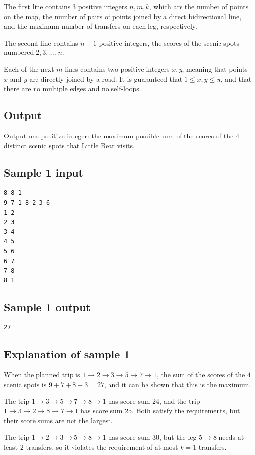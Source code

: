 \documentclass[11pt]{article}
\begin{document}
The first line contains $3$ positive integers $n, m, k$,
which are the number of points on the map,
the number of pairs of points joined by a direct bidirectional line,
and the maximum number of transfers on each leg, respectively.

The second line contains $n-1$ positive integers,
the scores of the scenic spots numbered $2, 3, \ldots, n$.

Each of the next $m$ lines contains two positive integers $x, y$,
meaning that points $x$ and $y$ are directly joined by a road.
It is guaranteed that $1 \le x, y \le n$,
and that there are no multiple edges and no self-loops.

\subsection*{Output}

Output one positive integer:
the maximum possible sum of the scores of the $4$ distinct scenic spots that
Little Bear visits.

\subsection*{Sample 1 input}

\begin{verbatim}
8 8 1
9 7 1 8 2 3 6
1 2
2 3
3 4
4 5
5 6
6 7
7 8
8 1
\end{verbatim}

\subsection*{Sample 1 output}

\begin{verbatim}
27
\end{verbatim}

\subsection*{Explanation of sample 1}

When the planned trip is $1 \to 2 \to 3 \to 5 \to 7 \to 1$,
the sum of the scores of the $4$ scenic spots is $9+7+8+3 = 27$,
and it can be shown that this is the maximum.

The trip $1 \to 3 \to 5 \to 7 \to 8 \to 1$ has score sum $24$,
and the trip $1 \to 3 \to 2 \to 8 \to 7 \to 1$ has score sum $25$.
Both satisfy the requirements, but their score sums are not the largest.

The trip $1 \to 2 \to 3 \to 5 \to 8 \to 1$ has score sum $30$,
but the leg $5 \to 8$ needs at least $2$ transfers,
so it violates the requirement of at most $k = 1$ transfers.
\end{document}
